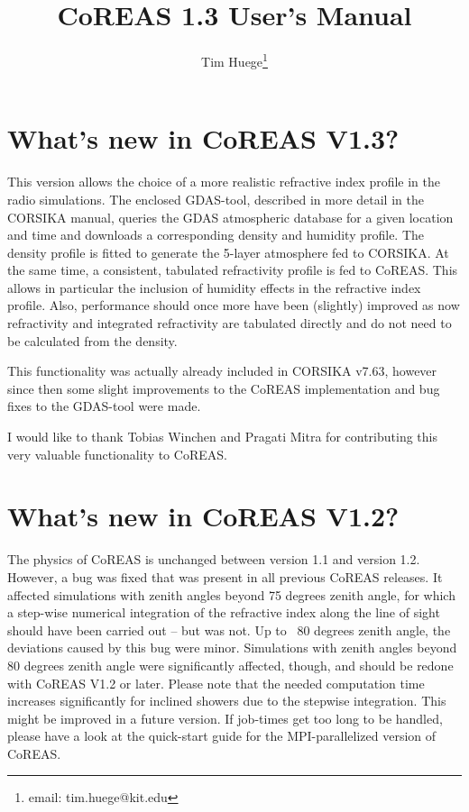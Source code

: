 \documentclass[a4paper,10pt]{article}
\title{CoREAS 1.3 User's Manual}
\author{Tim Huege\footnote{email: tim.huege@kit.edu}}
\begin{document}
\maketitle

\section{What's new in CoREAS V1.3?}

This version allows the choice of a more realistic refractive index profile in the radio simulations. The enclosed GDAS-tool, described in more detail in the CORSIKA manual, queries the GDAS atmospheric database for a given location and time and downloads a corresponding density and humidity profile. The density profile is fitted to generate the 5-layer atmosphere fed to CORSIKA. At the same time, a consistent, tabulated refractivity profile is fed to CoREAS. This allows in particular the inclusion of humidity effects in the refractive index profile. Also, performance should once more have been (slightly) improved as now refractivity and integrated refractivity are tabulated directly and do not need to be calculated from the density.

This functionality was actually already included in CORSIKA v7.63, however since then some slight improvements to the CoREAS implementation and bug fixes to the GDAS-tool were made.

I would like to thank Tobias Winchen and Pragati Mitra for contributing this very valuable functionality to CoREAS.

\section{What's new in CoREAS V1.2?}

The physics of CoREAS is unchanged between version 1.1 and version 1.2. However, a bug was fixed that was present in all previous CoREAS releases. It affected simulations with zenith angles beyond 75 degrees zenith angle, for which a step-wise numerical integration of the refractive index along the line of sight should have been carried out -- but was not. Up to ~80 degrees zenith angle, the deviations caused by this bug were minor. Simulations with zenith angles beyond 80 degrees zenith angle were significantly affected, though, and should be redone with CoREAS V1.2 or later. Please note that the needed computation time increases significantly for inclined showers due to the stepwise integration. This might be improved in a future version. If job-times get too long to be handled, please have a look at the quick-start guide for the MPI-parallelized version of CoREAS.
\end{document}

